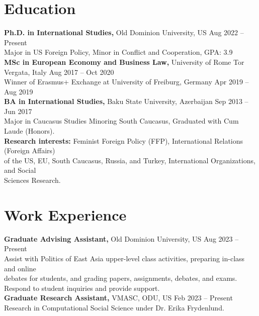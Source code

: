 \documentclass[10pt, a4paper]{article}
\begin{document}
\section*{Education}
\noindent \textbf{Ph.D. in International Studies,} Old Dominion University, US \hfill Aug 2022 – Present\\
\vspace{5pt} \hspace{-6pt}
{\small Major in US Foreign Policy, Minor in Conflict and Cooperation, GPA: 3.9}\\
\vspace{5pt} \hspace{-6pt}
\textbf{MSc in European Economy and Business Law,} University of Rome Tor Vergata, Italy \hfill Aug 2017 – Oct 2020 \\
\vspace{5pt} \hspace{-6pt}
Winner of Erasmus+ Exchange at University of Freiburg, Germany \hfill Apr 2019 – Aug 2019 \\
\textbf{BA in International Studies,} Baku State University, Azerbaijan \hfill Sep 2013 – Jun 2017\\ 
\vspace{5pt} \hspace{-6pt}
Major in Caucasus Studies Minoring South Caucasus, Graduated with Cum Laude (Honors). \\
\textbf{Research interests:} Feminist Foreign Policy (FFP), International Relations (Foreign Affairs) \\ of the US, EU, South Caucasus, Russia, and Turkey, International Organizations, and Social \\ Sciences Research. \\

\titlespacing*{\section}{0pt}{2pt}{2pt}
\section*{Work Experience}

\textbf{Graduate Advising Assistant,} Old Dominion University, US \hfill Aug 2023 – Present \\
{\small Assist with Politics of East Asia upper-level class activities, preparing in-class and online \\ debates for students, and grading papers, assignments, debates, and exams. \\ Respond to student inquiries and provide support. 
\vspace{5pt} \hspace{-6pt}
}\\
\textbf{Graduate Research Assistant,} VMASC, ODU, US \hfill Feb 2023 – Present\\
{\small Research in Computational Social Science under Dr. Erika Frydenlund.} 
\end{document}
